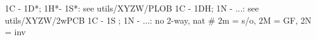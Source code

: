 1C - 1D*; 1H*- 1S*: see utils/XYZW/PLOB
1C - 1DH; 1N - ...: see utils/XYZW/2wPCB
1C - 1S ; 1N - ...: no 2-way, nat  # 2m = s/o, 2M = GF, 2N = inv
